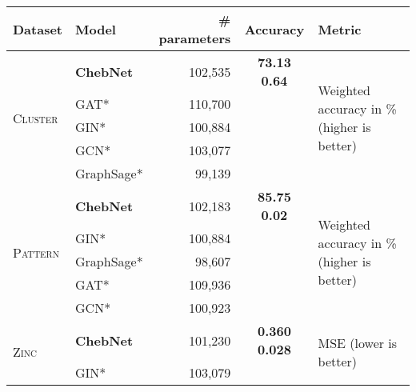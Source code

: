 \documentclass[letterpaper]{article} \usepackage{aaai21}  \usepackage{times}  \usepackage{helvet} \usepackage{courier}  \usepackage[hyphens]{url}  \usepackage{graphicx} \usepackage{natbib}  \usepackage{caption} \frenchspacing  \setlength{\pdfpagewidth}{8.5in}  \setlength{\pdfpageheight}{11in}
\begin{document}
\begin{table*}[ht!]
\centering
\centering
\begin{tabular}{@{}llrcl@{}}
\toprule
Dataset                      & Model     & \# parameters & Accuracy                                      & Metric                                                \\ \midrule
\multirow{5}{*}{\textsc{ Cluster} }    & \textbf{ChebNet}   &  102,535       & \textbf{73.13  0.64  }    & \multirow{5}{*}{Weighted accuracy in \% (higher is better)} \\
                             & GAT*       & 110,700        &                             &                                                       \\
                             & GIN*       & 100,884       &                              &                                                       \\
                             & GCN*       & 103,077       &                               &                                                       \\
                             & GraphSage* & 99,139        &                              &                                                       \\ \midrule
\multirow{5}{*}{\textsc{ Pattern} } & \textbf{ChebNet}   & 102,183        & \textbf{85.75  0.02 }    &  \multirow{5}{*}{Weighted accuracy in \% (higher is better)}  \\
                              & GIN*       & 100,884       &            &   \\
                             & GraphSage* & 98,607        &                               &                                                       \\
                             & GAT*       & 109,936        &                             &                                                       \\
                             & GCN*       & 100,923       &                              &                                                       \\ \midrule
\multirow{5}{*}{\textsc{ Zinc} } & \textbf{ChebNet}   & 101,230       & \textbf{0.360   0.028}   &         \multirow{5}{*}{MSE (lower is better)}                \\
                              &  GIN*       & 103,079       &        &                                                   \\

\end{tabular}
\end{table*}
\end{document}
